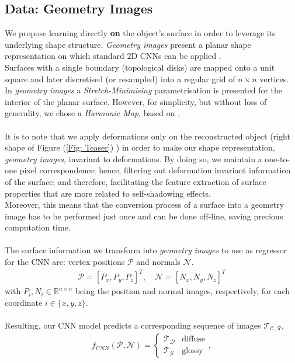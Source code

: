 \subsection{Data: Geometry Images}
We propose learning directly \textbf{on} the object's surface in order to leverage its underlying shape structure. \textit{Geometry images} present a planar shape representation on which standard 2D CNNs can be applied \cite{gu2002geometry, sinha2016deep}. 
\\ 
Surfaces with a single boundary (topological disks) are mapped onto a unit square and later discretised (or resampled) into a regular grid of $n \times n$ vertices. \\
In \textit{geometry images} a \textit{Stretch-Minimising} parametrisation is presented for the interior of the planar surface. However, for simplicity, but without loss of generality, we  chose a \textit{Harmonic Map}, based on \cite{HM_book, HarmonicMapping}. \\
\\
It is to note that we apply deformations only on the reconstructed object (right shape of Figure (\ref{Fig: Teaser}) ) in order to make our shape representation, \textit{geometry images}, invariant to deformations. By doing so, we maintain a one-to-one pixel correspondence; hence, filtering out deformation invariant information of the surface; and therefore, facilitating the feature extraction of surface properties that are more related to self-shadowing effects. 
\\
Moreover, this means that the conversion process of a surface into a geometry image has to be performed just once and can be done off-line, saving precious computation time.\\
\\
The surface information we transform into \textit{geometry images} to use as regressor for the CNN are: vertex positions $\mathcal{P}$ and normals $\mathcal{N}$. 
\begin{align*}
	\mathcal{P} = [ P_x, P_y, P_z ]^T , \quad
	\mathcal{N} = [ N_x, N_y, N_z ] ^T 
\end{align*}
with  $P_i, N_i \in \mathbb{R}^{n \times n }$ being the position and normal images, respectively, for each coordinate $i \in \{ x,y,z\}$.
\\
\\
Resulting, our CNN model predicts a corresponding sequence of images $\mathcal{T_{C,R}}$,
\begin{align*}
	f_{CNN} (  \mathcal{P} , \mathcal{N} ) = 
	\begin{cases}
	\mathcal{T_D}  & \text{diffuse} \\
	\mathcal{T_G} & \text{glossy}
	\end{cases},
\end{align*}
